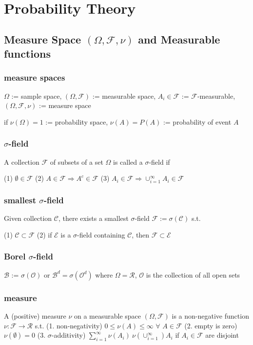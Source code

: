 \section{Probability Theory}

\subsection{Measure Space $(\Omega, \mathcal{F}, \nu)$ and Measurable functions}

\subsubsection{measure spaces}
$\Omega$ := sample space, $(\Omega, \mathcal{F})$ := measurable space, $A_i\in\mathcal{F}$ := $\mathcal{F}$-measurable,
$(\Omega, \mathcal{F}, \nu)$ := measure space

if $\nu(\Omega)=1$ := probability space, $\nu(A)=P(A)$ := probability of event $A$

\subsubsection{$\sigma$-field}
A collection $\mathcal{F}$ of subsets of a set $\Omega$ is called a $\sigma$-field if

(1) $\emptyset \in \mathcal{F}$
(2) $A \in \mathcal{F} \Rightarrow A^c \in \mathcal{F}$
(3) $A_i \in \mathcal{F} \Rightarrow \cup_{i=1}^\infty A_i \in \mathcal{F}$

\subsubsection{smallest $\sigma$-field}
Given collection $\mathcal{C}$, there exists a smallest $\sigma$-field $\mathcal{F}:=\sigma(\mathcal{C})$ s.t.

(1) $\mathcal{C}\subset\mathcal{F}$
(2) if $\mathcal{E}$ is a $\sigma$-field containing $\mathcal{C}$, then $\mathcal{F}\subset\mathcal{E}$

\subsubsection{Borel $\sigma$-field}
$\mathcal{B}$ := $\sigma(\mathcal{O})$ or $\mathcal{B}^d=\sigma(\mathcal{O}^d)$ where $\Omega=\mathcal{R}$, $\mathcal{O}$ is the collection of all open sets

\subsubsection{measure}
A (positive) measure $\nu$ on a measurable space $(\Omega, \mathcal{F})$ is a non-negative function $\nu: \mathcal{F} \rightarrow \mathcal{R}$ s.t.
\newline(1. non-negativity) $0\leq \nu(A) \leq \infty$ $\forall$ $A \in \mathcal{F}$
\newline(2. empty is zero) $\nu(\emptyset)=0$
\newline(3. $\sigma$-additivity) $\sum_{i=1}^\infty \nu(A_i) \ \nu(\cup_{i=1}^\infty) A_i$ if $A_i\in\mathcal{F}$ are disjoint

